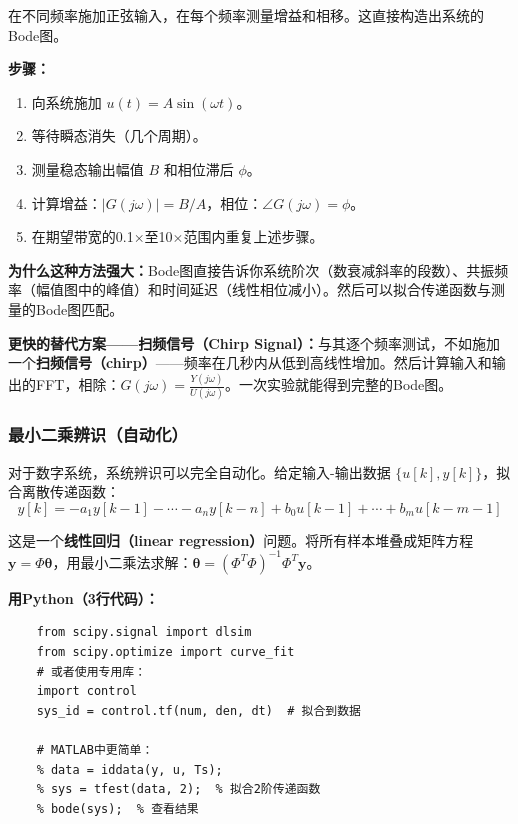 在不同频率施加正弦输入，在每个频率测量增益和相移。这直接构造出系统的Bode图。

\textbf{步骤：}
\begin{enumerate}
    \item 向系统施加 $u(t) = A \sin(\omega t)$。
    \item 等待瞬态消失（几个周期）。
    \item 测量稳态输出幅值 $B$ 和相位滞后 $\phi$。
    \item 计算增益：$|G(j\omega)| = B/A$，相位：$\angle G(j\omega) = \phi$。
    \item 在期望带宽的0.1$\times$至10$\times$范围内重复上述步骤。
\end{enumerate}

\textbf{为什么这种方法强大：}Bode图直接告诉你系统阶次（数衰减斜率的段数）、共振频率（幅值图中的峰值）和时间延迟（线性相位减小）。然后可以拟合传递函数与测量的Bode图匹配。

\textbf{更快的替代方案——扫频信号（Chirp Signal）：}与其逐个频率测试，不如施加一个\textbf{扫频信号（chirp）}——频率在几秒内从低到高线性增加。然后计算输入和输出的FFT，相除：$G(j\omega) = \frac{Y(j\omega)}{U(j\omega)}$。一次实验就能得到完整的Bode图。

\subsubsection{最小二乘辨识（自动化）}

对于数字系统，系统辨识可以完全自动化。给定输入-输出数据 $\{u[k], y[k]\}$，拟合离散传递函数：
\begin{equation}
y[k] = -a_1 y[k{-}1] - \cdots - a_n y[k{-}n] + b_0 u[k{-}1] + \cdots + b_m u[k{-}m{-}1]
\end{equation}

这是一个\textbf{线性回归（linear regression）}问题。将所有样本堆叠成矩阵方程 $\mathbf{y} = \Phi \boldsymbol{\theta}$，用最小二乘法求解：$\boldsymbol{\theta} = (\Phi^T \Phi)^{-1} \Phi^T \mathbf{y}$。

\textbf{用Python（3行代码）：}
\begin{verbatim}
    from scipy.signal import dlsim
    from scipy.optimize import curve_fit
    # 或者使用专用库：
    import control
    sys_id = control.tf(num, den, dt)  # 拟合到数据

    # MATLAB中更简单：
    % data = iddata(y, u, Ts);
    % sys = tfest(data, 2);  % 拟合2阶传递函数
    % bode(sys);  % 查看结果
\end{verbatim}

